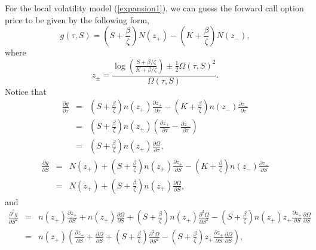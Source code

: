 \documentclass[12pt]{article}
\begin{document}
    For the local volatility model (\ref{expansion1}), we can guess the forward call option price to be given by the
    following form,
    \begin{equation}
      g(\tau,S)=\left(S+\frac{\beta}{\zeta}\right)N(z_+) - \left(K+\frac{\beta}{\zeta}\right)N(z_-),
    \end{equation}
    where
    \begin{equation}
      z_{\pm} = \frac{\log\left(\frac{S+\beta / \zeta}{K+\beta / \zeta}\right)\pm \frac{1}{2}\Omega(\tau,S)^2}
                     {\Omega(\tau,S)}.
      \label{expansion3}
    \end{equation}
    Notice that
    \begin{eqnarray}
      \frac{\partial g}{\partial \tau}
      &=& \left(S+\frac{\beta}{\zeta}\right)n(z_+)\frac{\partial z_+}{\partial\tau}
        - \left(K+\frac{\beta}{\zeta}\right)n(z_-)\frac{\partial z_-}{\partial\tau} \nonumber\\
      &=& \left(S+\frac{\beta}{\zeta}\right)n(z_+)\left(\frac{\partial z_+}{\partial\tau}
                                                     - \frac{\partial z_-}{\partial\tau}\right) \nonumber\\
      &=& \left(S+\frac{\beta}{\zeta}\right)n(z_+)\frac{\partial \Omega}{\partial\tau},
    \end{eqnarray}
    \begin{eqnarray}
      \frac{\partial g}{\partial S}
      &=& N(z_+) + \left(S+\frac{\beta}{\zeta}\right)n(z_+)\frac{\partial z_+}{\partial S}
        - \left(K+\frac{\beta}{\zeta}\right)n(z_-)\frac{\partial z_-}{\partial S} \nonumber\\
      &=& N(z_+) + \left(S+\frac{\beta}{\zeta}\right)n(z_+)\frac{\partial \Omega}{\partial S},
    \end{eqnarray}
    and
    \begin{eqnarray}
      \frac{\partial^2 g}{\partial S^2}
      &=& n(z_+)\frac{\partial z_+}{\partial S} + n(z_+)\frac{\partial \Omega}{\partial S}
        + \left(S+\frac{\beta}{\zeta}\right)n(z_+)\frac{\partial^2 \Omega}{\partial S^2}
        - \left(S+\frac{\beta}{\zeta}\right)n(z_+)z_+\frac{\partial z_+}{\partial S}\frac{\partial \Omega}{\partial S}\nonumber\\
      &=& n(z_+)\left(\frac{\partial z_+}{\partial S} + \frac{\partial \Omega}{\partial S}
        + \left(S+\frac{\beta}{\zeta}\right)\frac{\partial^2 \Omega}{\partial S^2}
        - \left(S+\frac{\beta}{\zeta}\right)z_+\frac{\partial z_+}{\partial S}\frac{\partial \Omega}{\partial S}\right),
    \end{eqnarray}
\end{document}
